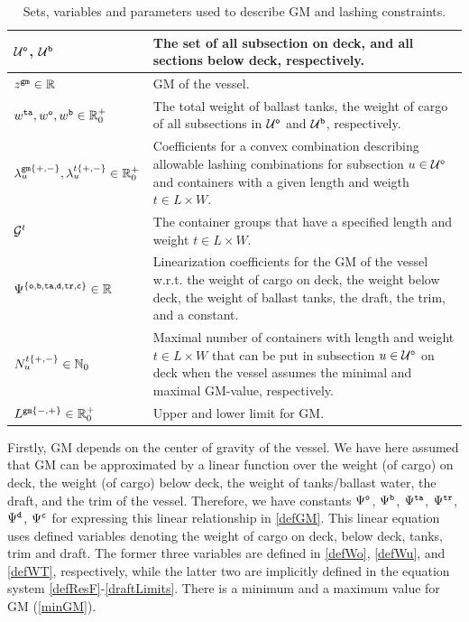 \begin{table}[width=.9\linewidth,cols=2,pos=h]
\caption{Sets, variables and parameters used to describe GM and lashing constraints.}\label{tab:gm}
\begin{tabular*}{\tblwidth}{@{} Lp{11.5cm} @{}}
\toprule
$\mathcal{U}^\texttt{o}$, $\mathcal{U}^\texttt{b}$	& The set of all subsection on deck, and all sections below deck, respectively.\\
\midrule
$z^{\texttt{gm}}\in\mathbb{R}$			&	GM of the vessel.\\
$w^{\texttt{ta}}, w^\texttt{o}, w^\texttt{b}\in\mathbb{R}^+_0$	
									&	The total weight of ballast tanks, the weight of cargo of all subsections in $\mathcal{U}^\texttt{o}$  and $\mathcal{U}^\texttt{b}$, respectively.\\
$\lambda^{\texttt{gm}\{+,-\}}_{u}, \lambda^{t\{+,-\}}_{u}\in\mathbb{R}^+_0$ 
									&	Coefficients for a convex combination describing allowable lashing combinations for subsection $u\in \mathcal{U}^\texttt{o}$ and containers with a given length and weigth $t\in L\times W$.\\
\midrule
$\mathcal{G}^t$							& The container groups that have a specified length and weight $t\in L\times W$.\\
$\Psi^{\{\tt{o},\texttt{b},\texttt{ta},\texttt{d},\texttt{tr},\texttt{c}\}}\in\mathbb{R}$	
									& Linearization coefficients for the GM of the vessel w.r.t. the weight of cargo on deck, the weight below deck, the weight of ballast tanks, the draft, the trim, and a constant.\\
$N^{t\{+,-\}}_{u}\in\mathbb{N}_0$		& Maximal number of containers with length and weight $t\in L\times W$ that can be put in subsection $u\in \mathcal{U}^\texttt{o}$ on deck when the vessel assumes the minimal and maximal GM-value, respectively.\\
$L^{\texttt{gm}\{-,+\}}\in\mathbb{R}^+_0$ 	& Upper and lower limit for GM.\\
\bottomrule
\end{tabular*}
\end{table}
 
Firstly, GM depends on the center of gravity of the vessel. We have here assumed that GM can be approximated by a linear function over the weight (of cargo) on deck, the weight (of cargo) below deck, the weight of tanks/ballast water, the draft, and the trim of the vessel. Therefore, we have constants $\Psi^{\texttt{o}}$, $\Psi^{\texttt{b}}$, $\Psi^{\texttt{ta}}$, $\Psi^{\texttt{tr}}$, $\Psi^{\texttt{d}}$, $\Psi^{\texttt{c}}$ for expressing this linear relationship in \eqref{defGM}. This linear equation uses defined variables denoting the weight of cargo on deck, below deck, tanks, trim and draft. The former three variables are defined in \eqref{defWo}, \eqref{defWu}, and \eqref{defWT}, respectively, while the latter two are implicitly defined in the equation system \eqref{defResF}-\eqref{draftLimits}. There is a minimum and a maximum value for GM (\ref{minGM}). %


